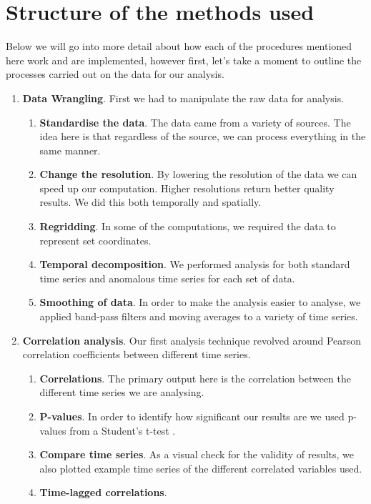 \documentclass[../main.tex]{subfiles}
\begin{document}
\section{Structure of the methods used}
Below we will go into more detail about how each of the procedures mentioned here work and are implemented, however first, let's take a moment to outline the processes carried out on the data for our analysis.
\begin{enumerate}
    \item \textbf{Data Wrangling}. First we had to manipulate the raw data for analysis. 
    \begin{enumerate}
        \item \textbf{Standardise the data}. The data came from a variety of sources. The idea here is that regardless of the source, we can process everything in the same manner.
        \item \textbf{Change the resolution}. By lowering the resolution of the data we can speed up our computation. Higher resolutions return better quality results. We did this both temporally and spatially.
        \item \textbf{Regridding}. In some of the computations, we required the data to represent set coordinates.
        \item \textbf{Temporal decomposition}. We performed analysis for both standard time series and anomalous time series for each set of data.
        \item \todo{[WIP]} \textbf{Smoothing of data}. In order to make the analysis easier to analyse, we applied band-pass filters and moving averages to a variety of time series. 
    \end{enumerate}
    \item \textbf{Correlation analysis}. Our first analysis technique revolved around Pearson correlation coefficients between different time series. 
    \begin{enumerate}
        \item \textbf{Correlations}. The primary output here is the correlation between the different time series we are analysing.
        \item \textbf{P-values}. In order to identify how significant our results are we used p-values from a Student's t-test .
        \item \textbf{Compare time series}. As a visual check for the validity of results, we also plotted example time series of the different correlated variables used.
        \item \todo{[WIP]} \textbf{Time-lagged correlations}.

\end{enumerate}
\end{enumerate}
\end{document}
